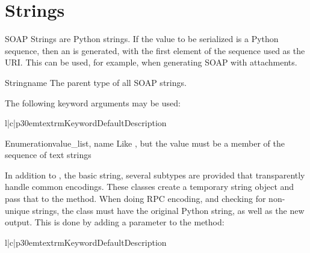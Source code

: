 \section{Strings}

SOAP Strings are Python strings.
If the value to be serialized is a Python sequence, then an 
is generated, with the first element of the sequence used as the URI.
This can be used, for example, when generating SOAP with attachments.

\begin{classdesc}{String}{name}
The parent type of all SOAP strings.

The following keyword arguments may be used:

\begin{tableiii}{l|c|p{30em}}{textrm}{Keyword}{Default}{Description}
\end{tableiii}
\end{classdesc}

\begin{classdesc}{Enumeration}{value_list, name}
Like , but the value must be a member of
the  sequence of text strings
\end{classdesc}

In addition to ,
the basic string, several subtypes are provided that transparently
handle common encodings.
These classes create a temporary string object and pass that to
the  method.
When doing RPC encoding, and checking for non-unique strings, the
 class must have the original Python string, as well
as the new output.
This is done by adding a parameter to the  method:

\begin{tableiii}{l|c|p{30em}}{textrm}{Keyword}{Default}{Description}
\end{tableiii}

